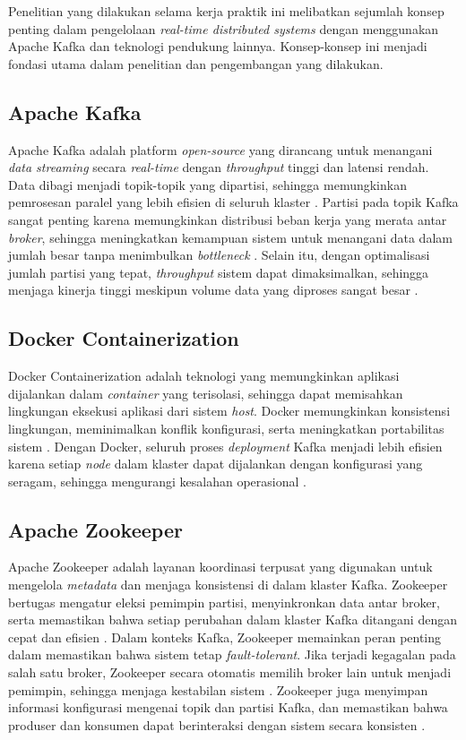 Penelitian yang dilakukan selama kerja praktik ini melibatkan sejumlah konsep penting dalam pengelolaan \textit{real-time distributed systems} dengan menggunakan Apache Kafka dan teknologi pendukung lainnya. Konsep-konsep ini menjadi fondasi utama dalam penelitian dan pengembangan yang dilakukan.

\subsection{Apache Kafka}

Apache Kafka adalah platform \textit{open-source} yang dirancang untuk menangani \textit{data streaming} secara \textit{real-time} dengan \textit{throughput} tinggi dan latensi rendah. Data dibagi menjadi topik-topik yang dipartisi, sehingga memungkinkan pemrosesan paralel yang lebih efisien di seluruh klaster \citep{elsevier:kafka}. Partisi pada topik Kafka sangat penting karena memungkinkan distribusi beban kerja yang merata antar \textit{broker}, sehingga meningkatkan kemampuan sistem untuk menangani data dalam jumlah besar tanpa menimbulkan \textit{bottleneck} \citep{elsevier:kafka}. Selain itu, dengan optimalisasi jumlah partisi yang tepat, \textit{throughput} sistem dapat dimaksimalkan, sehingga menjaga kinerja tinggi meskipun volume data yang diproses sangat besar \citep{elsevier:kafka}.

\subsection{Docker Containerization}

Docker Containerization adalah teknologi yang memungkinkan aplikasi dijalankan dalam \textit{container} yang terisolasi, sehingga dapat memisahkan lingkungan eksekusi aplikasi dari sistem \textit{host}. Docker memungkinkan konsistensi lingkungan, meminimalkan konflik konfigurasi, serta meningkatkan portabilitas sistem \citep{its:docker}. Dengan Docker, seluruh proses \textit{deployment} Kafka menjadi lebih efisien karena setiap \textit{node} dalam klaster dapat dijalankan dengan konfigurasi yang seragam, sehingga mengurangi kesalahan operasional \citep{its:docker}.

\subsection{Apache Zookeeper}

Apache Zookeeper adalah layanan koordinasi terpusat yang digunakan untuk mengelola \textit{metadata} dan menjaga konsistensi di dalam klaster Kafka. Zookeeper bertugas mengatur eleksi pemimpin partisi, menyinkronkan data antar broker, serta memastikan bahwa setiap perubahan dalam klaster Kafka ditangani dengan cepat dan efisien \citep{comp:zookeeper}. Dalam konteks Kafka, Zookeeper memainkan peran penting dalam memastikan bahwa sistem tetap \textit{fault-tolerant}. Jika terjadi kegagalan pada salah satu broker, Zookeeper secara otomatis memilih broker lain untuk menjadi pemimpin, sehingga menjaga kestabilan sistem \citep{comp:zookeeper}. Zookeeper juga menyimpan informasi konfigurasi mengenai topik dan partisi Kafka, dan memastikan bahwa produser dan konsumen dapat berinteraksi dengan sistem secara konsisten \citep{comp:zookeeper}.

